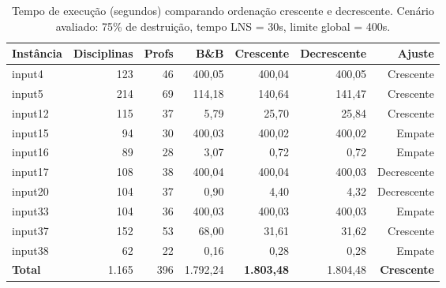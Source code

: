 \begin{table}[htbp]
\centering
\caption{Tempo de execução (segundos) comparando ordenação crescente e decrescente. Cenário avaliado: 75\% de destruição, tempo LNS = 30s, limite global = 400s.}
\label{tab:lns_order_tempo}
\small
\begin{tabular}{@{}lrrrrrr@{}}
\toprule
\textbf{Instância} & \textbf{Disciplinas} & \textbf{Profs} & \textbf{B\&B} & \textbf{Crescente} & \textbf{Decrescente} & \textbf{Ajuste} \\
\midrule
input4  & 123 & 46 & 400,05 & 400,04 & 400,05 & Crescente \\
input5  & 214 & 69 & 114,18 & 140,64 & 141,47 & Crescente \\
input12 & 115 & 37 & 5,79   & 25,70  & 25,84  & Crescente \\
input15 & 94  & 30 & 400,03 & 400,02 & 400,02 & Empate \\
input16 & 89  & 28 & 3,07   & 0,72   & 0,72   & Empate \\
input17 & 108 & 38 & 400,04 & 400,04 & 400,03 & Decrescente \\
input20 & 104 & 37 & 0,90   & 4,40   & 4,32   & Decrescente \\
input33 & 104 & 36 & 400,03 & 400,03 & 400,03 & Empate \\
input37 & 152 & 53 & 68,00  & 31,61  & 31,62  & Crescente \\
input38 & 62  & 22 & 0,16   & 0,28   & 0,28   & Empate \\
\midrule
\textbf{Total}  & 1.165 & 396 & 1.792,24 & \textbf{1.803,48} & 1.804,48 & \textbf{Crescente} \\
\bottomrule
\end{tabular}
\end{table}

